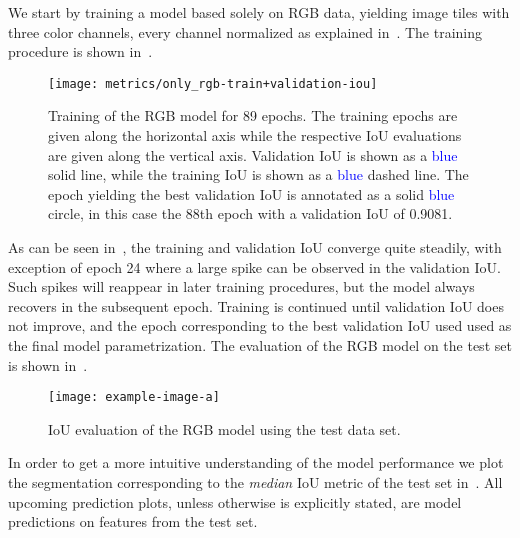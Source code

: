 We start by training a model based solely on RGB data, yielding image tiles with three color channels, every channel normalized as explained in~.
The training procedure is shown in~.

\begin{figure}[H]
  \centering
  \texttt{[image: metrics/only\_rgb-train+validation-iou]}
  \caption{%
    Training of the RGB model for 89 epochs.
    The training epochs are given along the horizontal axis while the respective IoU evaluations are given along the vertical axis.
    Validation IoU is shown as a \textcolor{blue}{blue} solid line, while the training IoU is shown as a \textcolor{blue}{blue} dashed line.
    The epoch yielding the best validation IoU is annotated as a solid \textcolor{blue}{blue} circle, in this case the 88th epoch with a validation IoU of \num{0.9081}.
  }%
  \label{fig:rgb-training}
\end{figure}

As can be seen in~, the training and validation IoU converge quite steadily, with exception of epoch 24 where a large spike can be observed in the validation IoU.
Such spikes will reappear in later training procedures, but the model always recovers in the subsequent epoch.
Training is continued until validation IoU does not improve, and the epoch corresponding to the best validation IoU used used as the final model parametrization.
The evaluation of the RGB model on the test set is shown in~.

\begin{figure}[H]
  \centering
  \texttt{[image: example-image-a]}
  \caption{%
    IoU evaluation of the RGB model using the test data set.
  }%
  \label{fig:rgb-model-test}
\end{figure}

In order to get a more intuitive understanding of the model performance we plot the segmentation corresponding to the \textit{median} IoU metric of the test set in~.
All upcoming prediction plots, unless otherwise is explicitly stated, are model predictions on features from the test set.

